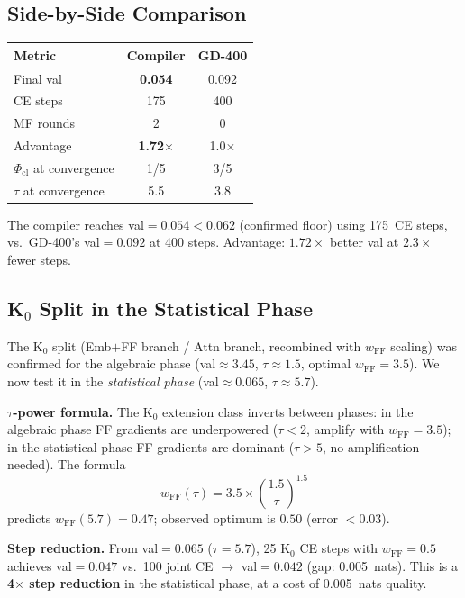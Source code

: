 \documentclass[11pt]{amsart}
\begin{document}
\subsection{Side-by-Side Comparison}

\begin{center}
\small
\begin{tabular}{lcc}
\toprule
Metric & Compiler & GD-400 \\
\midrule
Final val & \textbf{0.054} & 0.092 \\
CE steps & 175 & 400 \\
MF rounds & 2 & 0 \\
Advantage & \textbf{1.72$\times$} & 1.0$\times$ \\
$\Phi_\mathrm{cl}$ at convergence & 1/5 & 3/5 \\
$\tau$ at convergence & 5.5 & 3.8 \\
\bottomrule
\end{tabular}
\end{center}

\noindent
The compiler reaches val$=0.054 < 0.062$ (confirmed floor) using 175~CE steps,
vs.\ GD-400's val$=0.092$ at 400 steps.
Advantage: $1.72\times$ better val at $2.3\times$ fewer steps.

\subsection{K\texorpdfstring{$_0$}{0} Split in the Statistical Phase}

The K$_0$ split (Emb$+$FF branch / Attn branch, recombined with $w_\mathrm{FF}$
scaling) was confirmed for the algebraic phase (val$\approx 3.45$, $\tau \approx 1.5$,
optimal $w_\mathrm{FF}=3.5$). We now test it in the \emph{statistical phase}
(val$\approx 0.065$, $\tau \approx 5.7$).

\textbf{$\tau$-power formula.}
The K$_0$ extension class inverts between phases:
in the algebraic phase FF gradients are underpowered ($\tau < 2$, amplify with $w_\mathrm{FF}=3.5$);
in the statistical phase FF gradients are dominant ($\tau > 5$, no amplification needed).
The formula
\[
  w_\mathrm{FF}(\tau) = 3.5 \times \left(\frac{1.5}{\tau}\right)^{1.5}
\]
predicts $w_\mathrm{FF}(5.7) = 0.47$; observed optimum is $0.50$ (error $< 0.03$).

\textbf{Step reduction.}
From val$=0.065$ ($\tau=5.7$), 25 K$_0$ CE steps with $w_\mathrm{FF}=0.5$
achieves val$=0.047$ vs.\ 100 joint CE $\to$ val$=0.042$ (gap: 0.005~nats).
This is a \textbf{4$\times$ step reduction} in the statistical phase,
at a cost of 0.005~nats quality.
\end{document}
